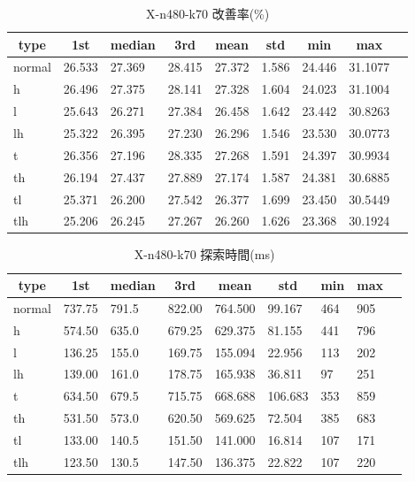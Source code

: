 \begin{table}[htbp]
    \caption{X-n480-k70 改善率(\%)}
    \begin{tabular}{|l|l|l|l|l|l|l|l|l|}\hline
    \multicolumn{1}{|c|}{\textbf{type}}
    &\multicolumn{1}{|c|}{\textbf{1st}}
    &\multicolumn{1}{c|}{\textbf{median}}
    &\multicolumn{1}{c|}{\textbf{3rd}}
    &\multicolumn{1}{c|}{\textbf{mean}}
    &\multicolumn{1}{c|}{\textbf{std}}
    &\multicolumn{1}{c|}{\textbf{min}}
    &\multicolumn{1}{c|}{\textbf{max}}\\\hline
	normal & 26.533 & 27.369 & 28.415 & 27.372 & 1.586 & 24.446 & 31.1077\\\hline
	h & 26.496 & 27.375 & 28.141 & 27.328 & 1.604 & 24.023 & 31.1004\\\hline
	l & 25.643 & 26.271 & 27.384 & 26.458 & 1.642 & 23.442 & 30.8263\\\hline
	lh & 25.322 & 26.395 & 27.230 & 26.296 & 1.546 & 23.530 & 30.0773\\\hline
	t & 26.356 & 27.196 & 28.335 & 27.268 & 1.591 & 24.397 & 30.9934\\\hline
	th & 26.194 & 27.437 & 27.889 & 27.174 & 1.587 & 24.381 & 30.6885\\\hline
	tl & 25.371 & 26.200 & 27.542 & 26.377 & 1.699 & 23.450 & 30.5449\\\hline
	tlh & 25.206 & 26.245 & 27.267 & 26.260 & 1.626 & 23.368 & 30.1924\\\hline
	\end{tabular}
\end{table}
\begin{table}[htbp]
    \caption{X-n480-k70 探索時間(ms)}
    \begin{tabular}{|l|l|l|l|l|l|l|l|l|}\hline
    \multicolumn{1}{|c|}{\textbf{type}}
    &\multicolumn{1}{|c|}{\textbf{1st}}
    &\multicolumn{1}{c|}{\textbf{median}}
    &\multicolumn{1}{c|}{\textbf{3rd}}
    &\multicolumn{1}{c|}{\textbf{mean}}
    &\multicolumn{1}{c|}{\textbf{std}}
    &\multicolumn{1}{c|}{\textbf{min}}
    &\multicolumn{1}{c|}{\textbf{max}}\\\hline
	normal & 737.75 & 791.5 & 822.00 & 764.500 & 99.167 & 464 & 905\\\hline
	h & 574.50 & 635.0 & 679.25 & 629.375 & 81.155 & 441 & 796\\\hline
	l & 136.25 & 155.0 & 169.75 & 155.094 & 22.956 & 113 & 202\\\hline
	lh & 139.00 & 161.0 & 178.75 & 165.938 & 36.811 & 97 & 251\\\hline
	t & 634.50 & 679.5 & 715.75 & 668.688 & 106.683 & 353 & 859\\\hline
	th & 531.50 & 573.0 & 620.50 & 569.625 & 72.504 & 385 & 683\\\hline
	tl & 133.00 & 140.5 & 151.50 & 141.000 & 16.814 & 107 & 171\\\hline
	tlh & 123.50 & 130.5 & 147.50 & 136.375 & 22.822 & 107 & 220\\\hline
	\end{tabular}
\end{table}
